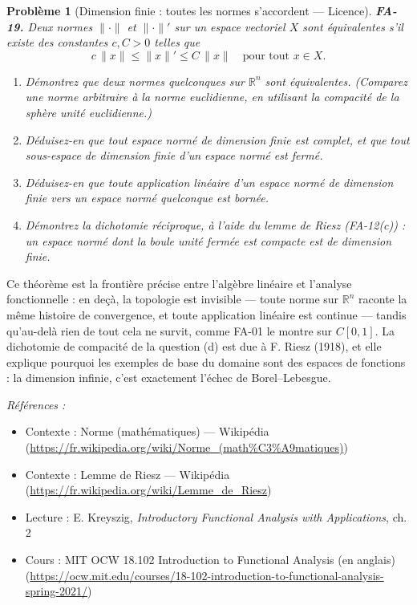 \documentclass[11pt]{article}
\newtheorem{problem}{Problème}
\newenvironment{refs}{\par\small\noindent\emph{Références :}\begin{itemize}\setlength\itemsep{0pt}}{\end{itemize}\normalsize}
\begin{document}
\begin{problem}[{Dimension finie : toutes les normes s'accordent --- Licence}]
\textbf{FA-19.} Deux normes $ \|\cdot\| $ et $ \|\cdot\|' $ sur un espace vectoriel $ X $
sont \textit{équivalentes} s'il existe des constantes $ c, C > 0 $ telles que
\[ c\,\|x\| \le \|x\|' \le C\,\|x\| \quad \text{pour tout } x \in X . \]
\begin{enumerate}
\item[(a)] Démontrez que deux normes quelconques sur $ \mathbb{R}^n $ sont équivalentes. (Comparez une
norme arbitraire à la norme euclidienne, en utilisant la compacité de la sphère unité euclidienne.)
\item[(b)] Déduisez-en que tout espace normé de dimension finie est complet, et que tout sous-espace de
dimension finie d'un espace normé est fermé.
\item[(c)] Déduisez-en que toute application linéaire d'un espace normé de dimension finie vers un espace
normé quelconque est bornée.
\item[(d)] Démontrez la dichotomie réciproque, à l'aide du lemme de Riesz (FA-12(c)) : un espace normé dont
la boule unité fermée est compacte est de dimension finie.
\end{enumerate}

\end{problem}

\noindent Ce théorème est la frontière précise entre l'algèbre linéaire et l'analyse
fonctionnelle : en deçà, la topologie est invisible --- toute norme sur $ \mathbb{R}^n $ raconte la
même histoire de convergence, et toute application linéaire est continue --- tandis qu'au-delà rien de
tout cela ne survit, comme FA-01 le montre sur $ C[0,1] $. La dichotomie de compacité de la question
(d) est due à F. Riesz (1918), et elle explique pourquoi les exemples de base du domaine sont des
espaces de fonctions : la dimension infinie, c'est exactement l'échec de Borel--Lebesgue.

\begin{refs}
\item Contexte : Norme (mathématiques) --- Wikipédia (\url{https://fr.wikipedia.org/wiki/Norme_(math%C3%A9matiques)})
\item Contexte : Lemme de Riesz --- Wikipédia (\url{https://fr.wikipedia.org/wiki/Lemme_de_Riesz})
\item Lecture : E. Kreyszig, \textit{Introductory Functional Analysis with Applications}, ch. 2
\item Cours : MIT OCW 18.102 Introduction to Functional Analysis (en anglais) (\url{https://ocw.mit.edu/courses/18-102-introduction-to-functional-analysis-spring-2021/})
\end{refs}
\end{document}
